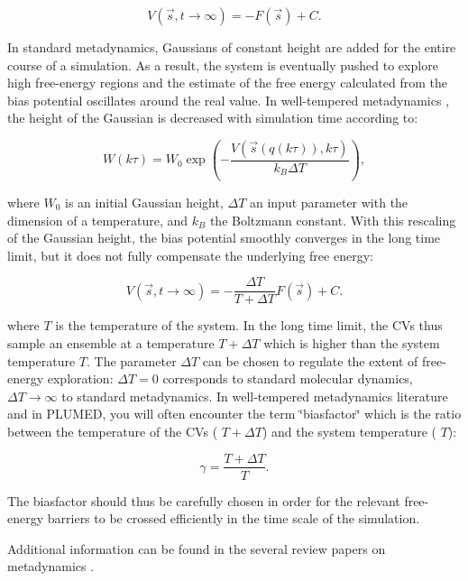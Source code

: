 \[ V(\vec{s},t\rightarrow \infty) = -F(\vec{s}) + C. \]

In standard metadynamics, Gaussians of constant height are added for the entire course of a simulation. As a result, the system is eventually pushed to explore high free-\/energy regions and the estimate of the free energy calculated from the bias potential oscillates around the real value. In well-\/tempered metadynamics \cite{Barducci:2008}, the height of the Gaussian is decreased with simulation time according to\+:

\[ W (k \tau ) = W_0 \exp \left( -\frac{V(\vec{s}({q}(k \tau)),k \tau)}{k_B\Delta T} \right ), \]

where $ W_0 $ is an initial Gaussian height, $ \Delta T $ an input parameter with the dimension of a temperature, and $ k_B $ the Boltzmann constant. With this rescaling of the Gaussian height, the bias potential smoothly converges in the long time limit, but it does not fully compensate the underlying free energy\+:

\[ V(\vec{s},t\rightarrow \infty) = -\frac{\Delta T}{T+\Delta T}F(\vec{s}) + C. \]

where $ T $ is the temperature of the system. In the long time limit, the C\+Vs thus sample an ensemble at a temperature $ T+\Delta T $ which is higher than the system temperature $ T $. The parameter $ \Delta T $ can be chosen to regulate the extent of free-\/energy exploration\+: $ \Delta T = 0$ corresponds to standard molecular dynamics, $ \Delta T \rightarrow \infty $ to standard metadynamics. In well-\/tempered metadynamics literature and in P\+L\+U\+M\+E\+D, you will often encounter the term \char`\"{}biasfactor\char`\"{} which is the ratio between the temperature of the C\+Vs ( $ T+\Delta T $) and the system temperature ( $ T $)\+:

\[ \gamma = \frac{T+\Delta T}{T}. \]

The biasfactor should thus be carefully chosen in order for the relevant free-\/energy barriers to be crossed efficiently in the time scale of the simulation.

Additional information can be found in the several review papers on metadynamics \cite{gerv-laio09review} \cite{WCMS:WCMS31} \cite{WCMS:WCMS1103}.



